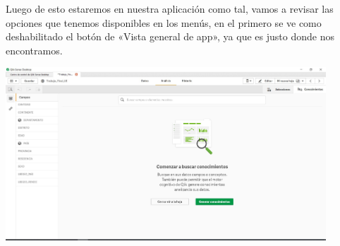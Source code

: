 Luego de esto estaremos en nuestra aplicación como tal, vamos a revisar las opciones que tenemos disponibles en los menús, en el primero se ve como deshabilitado el botón de «Vista general de app», ya que es justo donde nos encontramos.
\begin{center}
	\includegraphics[width=12cm]{./Imagenes/img14} 
\end{center}
